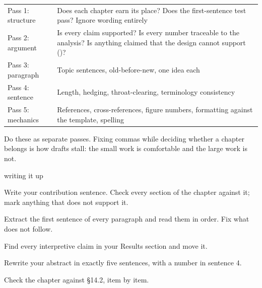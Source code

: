 \begin{center}
\small
\begin{tabular}{@{}L{3.0cm}L{11.3cm}@{}}
\toprule
Pass 1: structure & Does each chapter earn its place? Does the first-sentence
                    test pass? Ignore wording entirely \\
Pass 2: argument  & Is every claim supported? Is every number traceable to the
                    analysis? Is anything claimed that the design cannot
                    support ()? \\
Pass 3: paragraph & Topic sentences, old-before-new, one idea each \\
Pass 4: sentence  & Length, hedging, throat-clearing, terminology consistency \\
Pass 5: mechanics & References, cross-references, figure numbers, formatting
                    against the template, spelling \\
\bottomrule
\end{tabular}
\end{center}

Do these as separate passes. Fixing commas while deciding whether a chapter
belongs is how drafts stall: the small work is comfortable and the large work
is not.

\begin{traditions}{writing it up}
\end{traditions}

\begin{lab}
\begin{tightnum}
  \item Write your contribution sentence. Check every section of the chapter
    against it; mark anything that does not support it.
  \item Extract the first sentence of every paragraph and read them in order.
    Fix what does not follow.
  \item Find every interpretive claim in your Results section and move it.
  \item Rewrite your abstract in exactly five sentences, with a number in
    sentence 4.
  \item Check the chapter against \S14.2, item by item.
\end{tightnum}
\end{lab}

